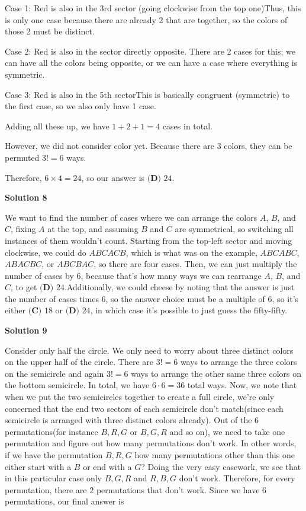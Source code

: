 \begin{enumerate}
 Case 1: Red is also in the 3rd sector (going clockwise from the top one)Thus, this is only one case because there are already 2 that are together, so the colors of those 2 must be distinct. 

 Case 2: Red is also in the sector directly opposite. There are 2 cases for this; we can have all the colors being opposite, or we can have a case where everything is symmetric. 

 Case 3: Red is also in the 5th sectorThis is basically congruent (symmetric) to the first case, so we also only have 1 case. 

 Adding all these up, we have $1+2+1=4$ cases in total.

 However, we did not consider color yet. Because there are 3 colors, they can be permuted $3!=6$ ways.  

 Therefore, $6\times4=24$, so our answer is $\boxed{\textbf{(D) } 24}$.

 



\textbf{Solution 8}

We want to find the number of cases where we can arrange the colors $A$, $B$, and $C$, fixing $A$ at the top, and assuming $B$ and $C$ are symmetrical, so switching all instances of them wouldn't count. Starting from the top-left sector and moving clockwise, we could do $ABCACB$, which is what was on the example, $ABCABC$, $ABACBC$, or $ABCBAC$, so there are four cases. Then, we can just multiply the number of cases by $6$, because that's how many ways we can rearrange $A$, $B$, and $C$, to get $\boxed{\textbf{(D) } 24}$.Additionally, we could cheese by noting that the answer is just the number of cases times $6$, so the answer choice must be a multiple of $6$, so it's either $\boxed{\textbf{(C) } 18}$ or $\boxed{\textbf{(D) } 24}$, in which case it's possible to just guess the fifty-fifty.

 



\textbf{Solution 9}

Consider only half the circle. We only need to worry about three distinct colors on the upper half of the circle. There are $3! = 6$ ways to arrange the three colors on the semicircle and again $3! = 6$ ways to arrange the other same three colors on the bottom semicircle. In total, we have $6 \cdot 6 = 36$ total ways. Now, we note that when we put the two semicircles together to create a full circle, we're only concerned that the end two sectors of each semicircle don't match(since each semicircle is arranged with three distinct colors already). Out of the $6$ permutations(for instance $B, R, G$ or $B, G, R$ and so on), we need to take one permutation and figure out how many permutations don't work. In other words, if we have the permutation $B, R, G$ how many permutations other than this one either start with a $B$ or end with a $G$? Doing the very easy casework, we see that in this particular case only $B, G, R$ and $R, B, G$ don't work. Therefore, for every permutation, there are $2$ permutations that don't work. Since we have $6$ permutations, our final answer is


\end{enumerate}
